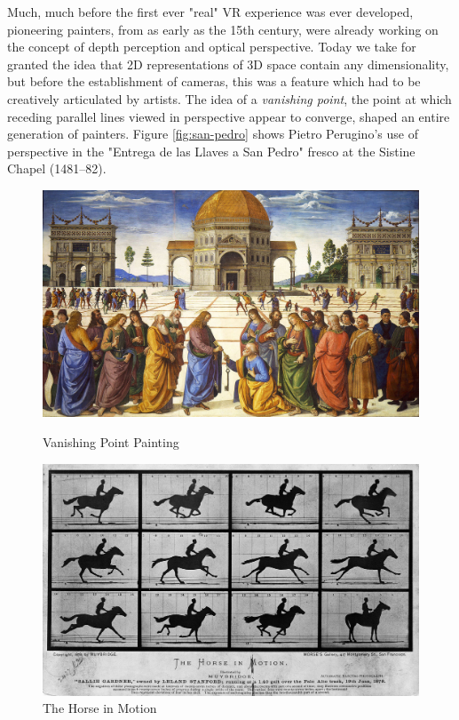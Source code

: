 Much, much before the first ever "real" VR experience was ever developed, pioneering painters, from as early as the 15th century, were already working on the concept of depth perception and optical perspective. Today we take for granted the idea that 2D representations of 3D space contain any dimensionality, but before the establishment of cameras, this was a feature which had to be creatively articulated by artists. The idea of a \textit{vanishing point}, the point at which receding parallel lines viewed in perspective appear to converge, shaped an entire generation of painters. Figure \ref{fig:san-pedro} shows Pietro Perugino's use of perspective in the "Entrega de las Llaves a San Pedro" fresco at the Sistine Chapel (1481–82).

\begin{figure}[!htb]
  \includegraphics[width=\linewidth]{img/perugino.jpg}
  \caption{Vanishing Point Painting \cite{FileEntr24online}}\label{fig:san-pedro}
\endminipage\hfill
{}
  \includegraphics[width=\linewidth]{img/horse-in-mot.jpg}
  \caption{The Horse in Motion \cite{FileTheH64online}}\label{fig:horse-motion}
\endminipage
\end{figure}

